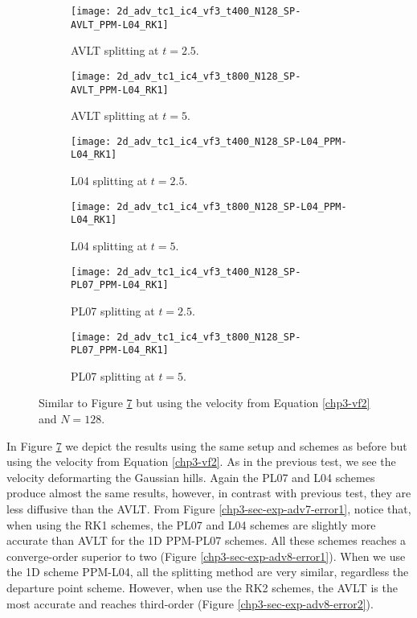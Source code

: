 \begin{figure}[!htb]
	\centering
	\begin{subfigure}{0.4\textwidth}
		\centering
		\texttt{[image: 2d\_adv\_tc1\_ic4\_vf3\_t400\_N128\_SP-AVLT\_PPM-L04\_RK1]}
		\caption{AVLT splitting at $t=2.5$.\label{chp3-sec-exp-adv4-a}}
	\end{subfigure}
	\begin{subfigure}{0.4\textwidth}
		\centering
		\texttt{[image: 2d\_adv\_tc1\_ic4\_vf3\_t800\_N128\_SP-AVLT\_PPM-L04\_RK1]}
		\caption{AVLT splitting at $t=5$.\label{chp3-sec-exp-adv4-b}}
	\end{subfigure}
	
	\begin{subfigure}{0.4\textwidth}
		\centering
		\texttt{[image: 2d\_adv\_tc1\_ic4\_vf3\_t400\_N128\_SP-L04\_PPM-L04\_RK1]}
		\caption{L04 splitting at $t=2.5$.\label{chp3-sec-exp-adv4-c}}
	\end{subfigure}
	\begin{subfigure}{0.4\textwidth}
		\centering
		\texttt{[image: 2d\_adv\_tc1\_ic4\_vf3\_t800\_N128\_SP-L04\_PPM-L04\_RK1]}
		\caption{L04 splitting at $t=5$.\label{chp3-sec-exp-adv4-d}}
	\end{subfigure} 
	
	\begin{subfigure}{0.4\textwidth}
		\centering
		\texttt{[image: 2d\_adv\_tc1\_ic4\_vf3\_t400\_N128\_SP-PL07\_PPM-L04\_RK1]}
		\caption{PL07 splitting at $t=2.5$.\label{chp3-sec-exp-adv4-e}}
	\end{subfigure}
	\begin{subfigure}{0.4\textwidth}
		\centering
		\texttt{[image: 2d\_adv\_tc1\_ic4\_vf3\_t800\_N128\_SP-PL07\_PPM-L04\_RK1]}
		\caption{PL07 splitting at $t=5$.\label{chp3-sec-exp-adv4-f}}
	\end{subfigure} 
	
	\caption{Similar to Figure \ref{chp3-sec-exp-adv4} but using the velocity from Equation \eqref{chp3-vf2} and $N=128$.
		\label{chp3-sec-exp-adv4}}
\end{figure}

In Figure \ref{chp3-sec-exp-adv4} we depict the results using the same setup and schemes as before but using the velocity from
Equation \eqref{chp3-vf2}. 
As in the previous test, we see the velocity deformarting the Gaussian hills.
Again the PL07 and L04 schemes produce almost the same results, however, in contrast with previous test, 
they are less diffusive than the AVLT.
From Figure \ref{chp3-sec-exp-adv7-error1},  notice that, when using the RK1 schemes, 
the PL07 and L04 schemes are slightly more accurate than AVLT for the 1D PPM-PL07 schemes.
All these schemes reaches a converge-order superior to two (Figure \ref{chp3-sec-exp-adv8-error1}).
When we use the 1D scheme PPM-L04, all the splitting method are very similar,
regardless the departure point scheme.
However, when use the RK2 schemes, the AVLT is the most accurate and reaches third-order (Figure \ref{chp3-sec-exp-adv8-error2}).

